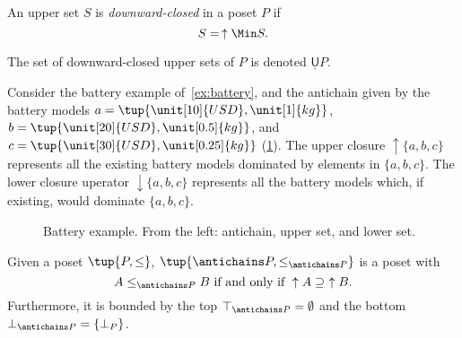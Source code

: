 \begin{definition}
\label{def:downward-closed-upperset}
An upper set $S$ is \emph{downward-closed} in a poset $P$ if
\begin{equation}
    S =\, \uparrow \Min S.
\end{equation}
\end{definition}
\begin{remark}
The set of downward-closed upper sets of $P$ is denoted $\underline{\mathsf{U}}P$.
\end{remark}

\begin{example}
Consider the battery example of~\cref{ex:battery}, and the antichain given by the battery models $a=\tup{\unit[10]{USD},\unit[1]{kg}}$, $b=\tup{\unit[20]{USD},\unit[0.5]{kg}}$, and $c=\tup{\unit[30]{USD},\unit[0.25]{kg}}$ (\cref{fig:examplebatt}).
The upper closure $\uparrow \{a,b,c\}$ represents all the existing battery models dominated by elements in $\{a,b,c\}$. The lower closure uperator $\downarrow\{a,b,c\}$ represents all the battery models which, if existing, would dominate $\{a,b,c\}$.
\begin{figure}[h!]
\begin{center}
\end{center}
\caption{Battery example. From the left: antichain, upper set, and lower set. \label{fig:examplebatt}}
\end{figure}
\end{example}

\begin{lemma}
Given a poset $\tup{P,\leq}$, $\tup{\antichains P,\leq_{\antichains P}}$ is a poset with
\begin{equation}
\label{eq:orderantichain}
    A\leq_{\antichains P} B \text{ if and only if } \uparrow A \supseteq \ \uparrow B.
\end{equation}
Furthermore, it is bounded by the top $\top_{\antichains P}=\emptyset$ and the bottom $\bot_{\antichains P}=\{\bot_P\}$.
\end{lemma}

